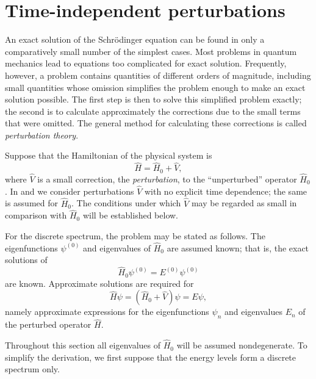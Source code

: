 \section{Time-independent perturbations}

An exact solution of the Schrödinger equation can be found in only a
comparatively small number of the simplest cases. Most problems in quantum
mechanics lead to equations too complicated for exact solution. Frequently,
however, a problem contains quantities of different orders of magnitude,
including small quantities whose omission simplifies the problem enough to
make an exact solution possible. The first step is then to solve this
simplified problem exactly; the second is to calculate approximately the
corrections due to the small terms that were omitted. The general method for
calculating these corrections is called \emph{perturbation theory}.

Suppose that the Hamiltonian of the physical system is
\[
  \hat H=\hat H_0+\hat V,
\]
where $\hat V$ is a small correction, the \emph{perturbation}, to the
``unperturbed'' operator $\hat H_0$. In  and  we consider
perturbations $\hat V$ with no explicit time dependence; the same is assumed
for $\hat H_0$. The conditions under which $\hat V$ may be regarded as small
in comparison with $\hat H_0$ will be established below.

For the discrete spectrum, the problem may be stated as follows. The
eigenfunctions $\psi^{(0)}$ and eigenvalues of $\hat H_0$ are assumed known;
that is, the exact solutions of
\begin{equation}
  \hat H_0\psi^{(0)}=E^{(0)}\psi^{(0)}
  \tag{38.1}
\end{equation}
are known. Approximate solutions are required for
\begin{equation}
  \hat H\psi=(\hat H_0+\hat V)\psi=E\psi,
  \tag{38.2}
\end{equation}
namely approximate expressions for the eigenfunctions $\psi_n$ and
eigenvalues $E_n$ of the perturbed operator $\hat H$.

Throughout this section all eigenvalues of $\hat H_0$ will be assumed
nondegenerate. To simplify the derivation, we first suppose that the energy
levels form a discrete spectrum only.

